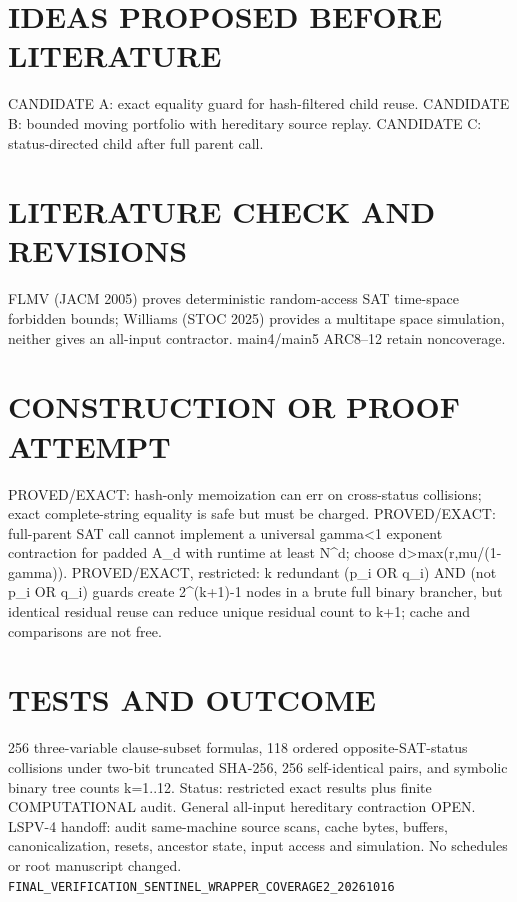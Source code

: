 \section*{IDEAS PROPOSED BEFORE LITERATURE}
CANDIDATE A: exact equality guard for hash-filtered child reuse. CANDIDATE B: bounded moving portfolio with hereditary source replay. CANDIDATE C: status-directed child after full parent call.
\section*{LITERATURE CHECK AND REVISIONS}
FLMV (JACM 2005) proves deterministic random-access SAT time-space forbidden bounds; Williams (STOC 2025) provides a multitape space simulation, neither gives an all-input contractor. main4/main5 ARC8--12 retain noncoverage.
\section*{CONSTRUCTION OR PROOF ATTEMPT}
PROVED/EXACT: hash-only memoization can err on cross-status collisions; exact complete-string equality is safe but must be charged. PROVED/EXACT: full-parent SAT call cannot implement a universal gamma<1 exponent contraction for padded A_d with runtime at least N^d; choose d>max(r,mu/(1-gamma)). PROVED/EXACT, restricted: k redundant (p_i OR q_i) AND (not p_i OR q_i) guards create 2^(k+1)-1 nodes in a brute full binary brancher, but identical residual reuse can reduce unique residual count to k+1; cache and comparisons are not free.
\section*{TESTS AND OUTCOME}
256 three-variable clause-subset formulas, 118 ordered opposite-SAT-status collisions under two-bit truncated SHA-256, 256 self-identical pairs, and symbolic binary tree counts k=1..12. Status: restricted exact results plus finite COMPUTATIONAL audit. General all-input hereditary contraction OPEN. LSPV-4 handoff: audit same-machine source scans, cache bytes, buffers, canonicalization, resets, ancestor state, input access and simulation. No schedules or root manuscript changed.
\texttt{FINAL_VERIFICATION_SENTINEL_WRAPPER_COVERAGE2_20261016}
